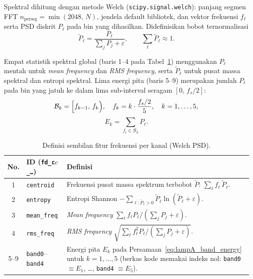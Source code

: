 Spektral dihitung dengan metode Welch (\texttt{scipy.signal.welch}):
panjang segmen FFT
$n_{\mathrm{perseg}} = \min(2048,\, N)$,
jendela default bibliotek, dan vektor frekuensi $f_\ell$ serta PSD
diskrit $P_\ell$ pada bin yang dihasilkan.
Didefinisikan bobot ternormalisasi
\begin{equation}\label{eq:lampA_psd_norm}
  \tilde{P}_\ell = \frac{P_\ell}{\sum_{j} P_j + \varepsilon},
  \qquad
  \sum_{\ell} \tilde{P}_\ell \approx 1.
\end{equation}

\noindent Empat statistik spektral global (baris 1--4 pada
Tabel~\ref{tab:lampA_freq}) menggunakan $P_\ell$ mentah untuk
\emph{mean frequency} dan \emph{RMS frequency}, serta $\tilde{P}_\ell$
untuk pusat massa spektral dan entropi spektral.
Lima energi pita (baris 5--9) merupakan jumlah $P_\ell$ pada bin yang
jatuh ke dalam lima sub-interval seragam
$[0,\, f_s/2]$:
\begin{equation}\label{eq:lampA_band}
  \mathcal{B}_k =
  \Bigl[f_{k-1},\, f_k\Bigr),
  \quad
  f_k = k \cdot \frac{f_s/2}{5},
  \quad
  k = 1,\ldots,5,
\end{equation}
\begin{equation}\label{eq:lampA_band_energy}
  E_k = \sum_{f_\ell \in \mathcal{B}_k} P_\ell .
\end{equation}

\begin{table}[ht]
  \centering
  \caption{Definisi sembilan fitur frekuensi per kanal (Welch PSD).}
  \label{tab:lampA_freq}
  \footnotesize
  \begin{tabularx}{\textwidth}{@{}c l X@{}}
    \toprule
    \textbf{No.} & \textbf{ID (\texttt{fd\_c$c$\_\dots})} & \textbf{Definisi} \\
    \midrule
    1 & \texttt{centroid} &
    Frekuensi pusat massa spektrum terbobot $\tilde{P}$:
    $\sum_{\ell} f_\ell\, \tilde{P}_\ell$. \\
    2 & \texttt{entropy} &
    Entropi Shannon
    $-\sum_{\ell : \tilde{P}_\ell > 0}
    \tilde{P}_\ell \ln(\tilde{P}_\ell + \varepsilon)$. \\
    3 & \texttt{mean\_freq} &
    \emph{Mean frequency}
    $\sum_{\ell} f_\ell P_\ell / (\sum_{j} P_j + \varepsilon)$. \\
    4 & \texttt{rms\_freq} &
    \emph{RMS frequency}
    $\sqrt{\sum_{\ell} f_\ell^2 P_\ell / (\sum_{j} P_j + \varepsilon)}$. \\
    5--9 & \texttt{band0}--\texttt{band4} &
    Energi pita $E_k$ pada Persamaan~\eqref{eq:lampA_band_energy}
    untuk $k = 1,\ldots,5$ (berkas kode memakai indeks nol:
    \texttt{band0} $\equiv E_1$, \ldots, \texttt{band4} $\equiv E_5$). \\
    \bottomrule
  \end{tabularx}
\end{table}

